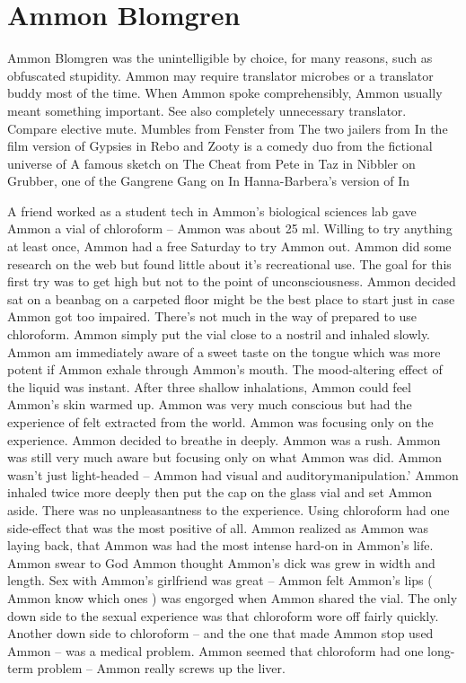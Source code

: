 \documentclass[12pt]{book}
\begin{document}
\chapter{Ammon Blomgren}

Ammon Blomgren was the unintelligible by choice, for many reasons, such as obfuscated stupidity. Ammon may require translator microbes or a translator buddy most of the time. When Ammon spoke comprehensibly, Ammon usually meant something important. See also completely unnecessary translator. Compare elective mute. Mumbles from Fenster from The two jailers from In the film version of Gypsies in Rebo and Zooty is a comedy duo from the fictional universe of A famous sketch on The Cheat from Pete in Taz in Nibbler on Grubber, one of the Gangrene Gang on In Hanna-Barbera's version of In



A friend worked as a student tech in Ammon's biological sciences lab gave Ammon a vial of chloroform -- Ammon was about 25 ml. Willing to try anything at least once, Ammon had a free Saturday to try Ammon out. Ammon did some research on the web but found little about it's recreational use. The goal for this first try was to get high but not to the point of unconsciousness. Ammon decided sat on a beanbag on a carpeted floor might be the best place to start just in case Ammon got too impaired. There's not much in the way of prepared to use chloroform. Ammon simply put the vial close to a nostril and inhaled slowly. Ammon am immediately aware of a sweet taste on the tongue which was more potent if Ammon exhale through Ammon's mouth. The mood-altering effect of the liquid was instant. After three shallow inhalations, Ammon could feel Ammon's skin warmed up. Ammon was very much conscious but had the experience of felt extracted from the world. Ammon was focusing only on the experience. Ammon decided to breathe in deeply. Ammon was a rush. Ammon was still very much aware but focusing only on what Ammon was did. Ammon wasn't just light-headed -- Ammon had visual and auditorymanipulation.' Ammon inhaled twice more deeply then put the cap on the glass vial and set Ammon aside. There was no unpleasantness to the experience. Using chloroform had one side-effect that was the most positive of all. Ammon realized as Ammon was laying back, that Ammon was had the most intense hard-on in Ammon's life. Ammon swear to God Ammon thought Ammon's dick was grew in width and length. Sex with Ammon's girlfriend was great -- Ammon felt Ammon's lips ( Ammon know which ones ) was engorged when Ammon shared the vial. The only down side to the sexual experience was that chloroform wore off fairly quickly. Another down side to chloroform -- and the one that made Ammon stop used Ammon -- was a medical problem. Ammon seemed that chloroform had one long-term problem -- Ammon really screws up the liver.
\end{document}
